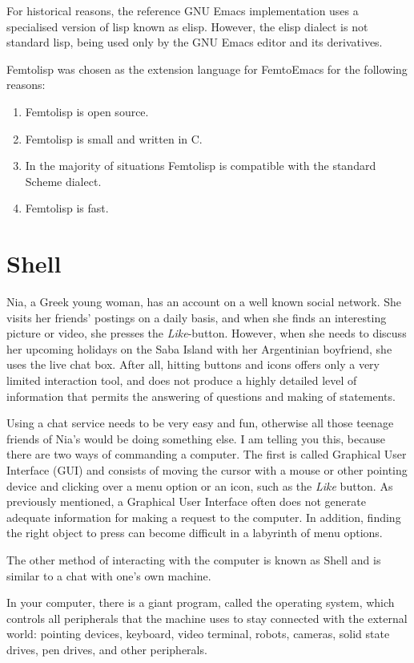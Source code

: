 \documentclass[a4paper,12pt]{book}
\begin{document}
  For historical reasons, the reference GNU
  Emacs implementation uses a specialised version of
  lisp known as elisp.  However, the elisp
  dialect is not standard lisp, being used
  only by the GNU Emacs editor and its
  derivatives.

  Femtolisp was chosen
  as the extension language
  for FemtoEmacs for the following reasons:
\begin{enumerate}
\item Femtolisp is open source.
\item Femtolisp is small and written in C.
\item In the majority of situations Femtolisp is compatible
  with the standard Scheme dialect.
\item Femtolisp is fast.
\end{enumerate}    

\mainmatter


\chapter{Shell}

Nia, a Greek young woman, has an
account on a well known social network.
She visits her friends' postings on a daily basis,
and when she finds an interesting picture or video,
she presses the {\em Like}-button. However, when
she needs to discuss her upcoming holidays on the Saba Island
with her Argentinian boyfriend, she uses the
live chat box. After all, hitting buttons and
icons offers only a very limited interaction tool,
and does not produce a highly detailed
level of information that permits the answering
of questions and making of statements.


Using a chat service needs to
be very easy and fun, otherwise all those teenage
friends of Nia's would be doing something else.
I am telling you this, because there are
two ways of commanding a computer.
The first is called Graphical User Interface (GUI)
and consists of moving the cursor with a
mouse or other pointing device and clicking
over a menu option or an icon,
such as the {\em Like} button.
As previously mentioned, a Graphical User Interface
often does not generate adequate information
for making a request to the computer. In addition,
finding the right object  to press
can become difficult in a labyrinth of
menu options.

The other method of interacting with
the computer is known as Shell and is similar to
a chat with one's own machine.

 In your computer, there is a giant
program, called the operating system, which controls
all peripherals that the machine uses to
stay connected with the external world:
pointing devices,  keyboard,
video terminal, robots, cameras, solid
state drives, pen drives, and other peripherals.
\end{document}
